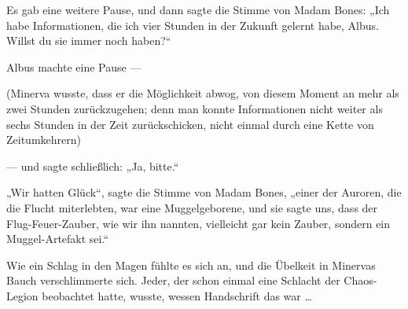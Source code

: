 Es gab eine weitere Pause, und dann sagte die Stimme von Madam Bones:
„Ich habe Informationen, die ich vier Stunden in der Zukunft gelernt habe, Albus. Willst du sie immer noch haben?“

Albus machte eine Pause —

(Minerva wusste, dass er die Möglichkeit abwog, von diesem Moment an mehr als zwei Stunden zurückzugehen; denn man konnte Informationen nicht weiter als sechs Stunden in der Zeit zurückschicken, nicht einmal durch eine Kette von Zeitumkehrern)

— und sagte schließlich:
„Ja, bitte.“

„Wir hatten Glück“, sagte die Stimme von Madam Bones, „einer der Auroren, die die Flucht miterlebten, war eine Muggelgeborene, und sie sagte uns, dass der Flug-Feuer-Zauber, wie wir ihn nannten, vielleicht gar kein Zauber, sondern ein Muggel-Artefakt sei.“

Wie ein Schlag in den Magen fühlte es sich an, und die Übelkeit in Minervas Bauch verschlimmerte sich. Jeder, der schon einmal eine Schlacht der Chaos-Legion beobachtet hatte, wusste, wessen Handschrift das war …

